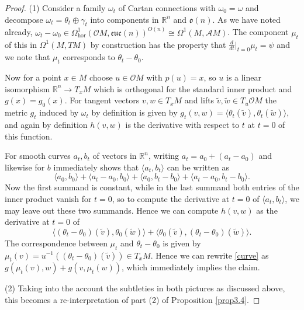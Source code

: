 \documentclass[12pt,a4paper]{amsart}
\def\frak{\mathfrak}
\def\Bbb{\mathbb}
\def\Cal{\mathcal}
\newcommand{\ga}{\gamma}
\newcommand{\om}{\omega}
\renewcommand{\th}{\theta}
\newcommand{\Om}{\Omega}
\newcommand{\euc}{\mathfrak{euc}}
\newcommand{\hor}{\text{hor}}
\numberwithin{theorem}{section}
\numberwithin{equation}{section}
\theoremstyle{definition}
\theoremstyle{remark}
\begin{document}
\begin{proof}
(1) Consider a family $\om_t$ of Cartan connections with $\om_0=\om$ and decompose
  $\om_t=\th_t\oplus\ga_t$ into components in $\Bbb R^n$ and $\frak o(n)$. As we have
  noted already, $\om_t-\om_0\in\Om^1_{\hor}(\Cal OM,\euc(n))^{O(n)}\cong\Om^1(M,\Cal
  AM)$. The component $\mu_t$ of this in $\Om^1(M,TM)$ by construction has the
  property that $\frac{d}{dt}|_{t=0}\mu_t=\psi$ and we note that $\mu_t$ corresponds
  to $\th_t-\th_0$.

Now for a point $x\in M$ choose $u\in \Cal OM$ with $p(u)=x$, so $u$ is a linear
isomorphism $\Bbb R^n\to T_xM$ which is orthogonal for the standard inner product and
$g(x)=g_0(x)$. For tangent vectors $v,w\in T_xM$ and lifts
$\widetilde{v},\widetilde{w}\in T_u\Cal OM$ the metric $g_t$ induced by $\om_t$ by
definition is given by
$g_t(v,w)=\langle\th_t(\widetilde{v}),\th_t(\widetilde{w})\rangle$, and again by
definition $h(v,w)$ is the derivative with respect to $t$ at $t=0$ of this function.

For smooth curves $a_t,b_t$ of vectors in $\Bbb R^n$, writing $a_t=a_0+(a_t-a_0)$ and
likewise for $b$ immediately shows that $\langle a_t,b_t\rangle$ can be written as
$$
\langle a_0,b_0\rangle+\langle a_t-a_0,b_0\rangle+\langle a_0,b_t-b_0\rangle+\langle
a_t-a_0,b_t-b_0\rangle. 
$$
Now the first summand is constant, while in the last summand both entries of the
inner product vanish for $t=0$, so to compute the derivative at $t=0$ of $\langle 
a_t,b_t\rangle$, we may leave out these two summands. Hence we can compute $h(v,w)$
as the derivative at $t=0$ of
\begin{equation}\label{curve}
\langle(\th_t-\th_0)(\widetilde{v}),\th_0(\widetilde{w})\rangle+
\langle\th_0(\widetilde{v}),(\th_t-\th_0)(\widetilde{w})\rangle. 
\end{equation}
The correspondence between $\mu_t$ and $\th_t-\th_0$ is given by
$\mu_t(v)=u^{-1}((\th_t-\th_0)(\widetilde{v}))\in T_xM$. Hence we can rewrite
\eqref{curve} as $g(\mu_t(v),w)+g(v,\mu_t(w))$, which immediately implies the claim.

(2) Taking into the account the subtleties in both pictures as discussed above, this
becomes a re-interpretation of part (2) of Proposition \ref{prop3.4}.
\end{proof}
\end{document}
